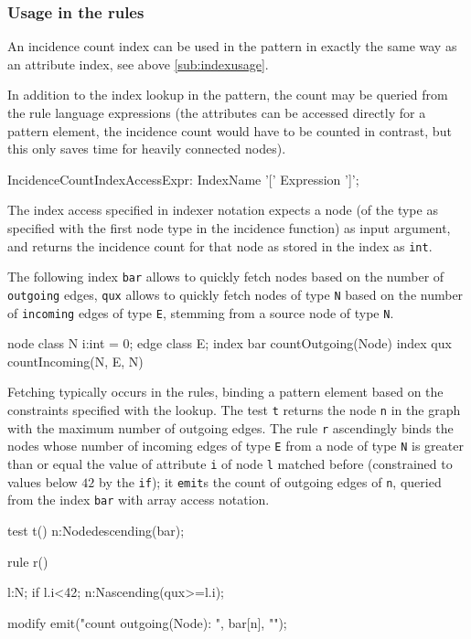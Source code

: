 \subsubsection*{Usage in the rules}
An incidence count index can be used in the pattern in exactly the same way as an attribute index, see above \ref{sub:indexusage}.

In addition to the index lookup in the pattern, 
the count may be queried from the rule language expressions (the attributes can be accessed directly for a pattern element, the incidence count would have to be counted in contrast, but this only saves time for heavily connected nodes).

\begin{rail}
  IncidenceCountIndexAccessExpr:
    IndexName '[' Expression ']';
\end{rail}

The index access specified in indexer notation expects a node (of the type as specified with the first node type in the incidence function) as input argument, and returns the incidence count for that node as stored in the index as \texttt{int}.

\begin{example}
The following index \texttt{bar} allows to quickly fetch nodes based on the number of \texttt{outgoing} edges, \texttt{qux} allows to quickly fetch nodes of type \texttt{N} based on the number of \texttt{incoming} edges of type \texttt{E}, stemming from a source node of type \texttt{N}.

\begin{grgen}
node class N {
	i:int = 0;
}
edge class E;
index bar { countOutgoing(Node) }
index qux { countIncoming(N, E, N) }
\end{grgen}

Fetching typically occurs in the rules, binding a pattern element based on the constraints specified with the lookup.
The test \texttt{t} returns the node \texttt{n} in the graph with the maximum number of outgoing edges.
The rule \texttt{r} ascendingly binds the nodes whose number of incoming edges of type \texttt{E} from a node of type \texttt{N} is greater than or equal the value of attribute \texttt{i} of node \texttt{l} matched before (constrained to values below $42$ by the \texttt{if}); it \texttt{emit}s the count of outgoing edges of \texttt{n}, queried from the index \texttt{bar} with array access notation.

\begin{grgen}
test t() {
	n:Node{descending(bar)};
}

rule r() {
  l:N; if{ l.i<42;}
  n:N{ascending(qux>=l.i)};
	
  modify {
    emit("count outgoing(Node): ", bar[n], "\n");
  }
}
\end{grgen}

\end{example}

